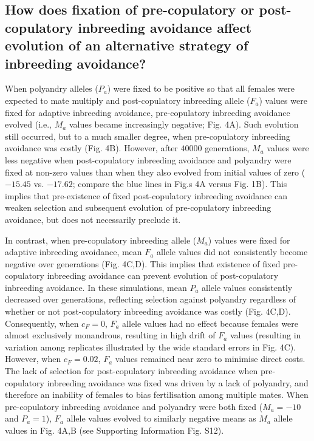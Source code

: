 \documentclass[12pt]{article}
\begin{document}
\subsection*{How does fixation of pre-copulatory or post-copulatory inbreeding avoidance affect evolution of an alternative strategy of inbreeding avoidance?}

When polyandry alleles ($P_{a}$) were fixed to be positive so that all females were expected to mate multiply and post-copulatory inbreeding allele ($F_{a}$) values were fixed for adaptive inbreeding avoidance, pre-copulatory inbreeding avoidance evolved (i.e., $M_{a}$ values became increasingly negative; Fig. 4A). Such evolution still occurred, but to a much smaller degree, when pre-copulatory inbreeding avoidance was costly (Fig. 4B). However, after $40000$ generations, $M_{a}$ values were less negative when post-copulatory inbreeding avoidance and polyandry were fixed at non-zero values than when they also evolved from initial values of zero ($-15.45$ vs. $-17.62$; compare the blue lines in Fig.s 4A versus Fig. 1B). This implies that pre-existence of fixed post-copulatory inbreeding avoidance can weaken selection and subsequent evolution of pre-copulatory inbreeding avoidance, but does not necessarily preclude it.

In contrast, when pre-copulatory inbreeding allele ($M_{a}$) values were fixed for adaptive inbreeding avoidance, mean $F_{a}$ allele values did not consistently become negative over generations (Fig. 4C,D). This implies that existence of fixed pre-copulatory inbreeding avoidance can prevent evolution of post-copulatory inbreeding avoidance. In these simulations, mean $P_{a}$ allele values consistently decreased over generations, reflecting selection against polyandry regardless of whether or not post-copulatory inbreeding avoidance was costly (Fig. 4C,D). Consequently, when $c_{F}=0$, $F_{a}$ allele values had no effect because females were almost exclusively monandrous, resulting in high drift of $F_{a}$ values (resulting in variation among replicates illustrated by the wide standard errors in Fig. 4C). However, when $c_{F}=0.02$, $F_{a}$ values remained near zero to minimise direct costs. The lack of selection for post-copulatory inbreeding avoidance when pre-copulatory inbreeding avoidance was fixed was driven by a lack of polyandry, and therefore an inability of females to bias fertilisation among multiple mates. When pre-copulatory inbreeding avoidance and polyandry were both fixed ($M_{a}=-10$ and $P_{a}=1$), $F_{a}$ allele values evolved to similarly negative means as $M_{a}$ allele values in Fig. 4A,B (see Supporting Information Fig. S12). 
\end{document}
